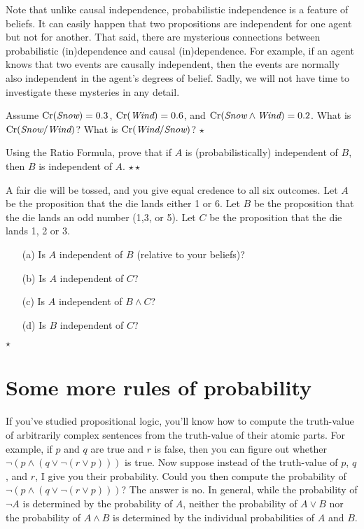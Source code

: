Note that unlike causal independence, probabilistic independence is a
feature of beliefs. It can easily happen that two propositions are
independent for one agent but not for another. That said, there are
mysterious connections between probabilistic (in)dependence and causal
(in)dependence. For example, if an agent knows that two events are
causally independent, then the events are normally also independent in
the agent's degrees of belief. Sadly, we will not have time to
investigate these mysteries in any detail.

\begin{exercise}
  Assume $\text{Cr}(\emph{Snow}) = 0.3$, $\text{Cr}(\emph{Wind}) = 0.6$, and $\text{Cr}(\emph{Snow} \land
  \emph{Wind}) = 0.2$. What is $\text{Cr}(\emph{Snow}/\emph{Wind})$? What is $\text{Cr}(\emph{Wind}/\emph{Snow})$? $\star$
\end{exercise}

\begin{exercise}
  Using the Ratio Formula, prove that if $A$ is (probabilistically)
  independent of $B$, then $B$ is independent of $A$. $\star\star$
\end{exercise}

\begin{exercise}
  A fair die will be tossed, and you give equal credence to all six
  outcomes. Let $A$ be the proposition that the die lands either 1 or
  6. Let $B$ be the proposition that the die lands an odd number (1,3,
  or 5). Let $C$ be the proposition that the die lands 1, 2 or 3.
  \begin{enumerate}
  \itemsep0em 
  \item[(a)] Is $A$ independent of $B$ (relative to your beliefs)?
  \item[(b)] Is $A$ independent of $C$?
  \item[(c)] Is $A$ independent of $B \land C$?
  \item[(d)] Is $B$ independent of $C$?
  \end{enumerate}
  $\star$
\end{exercise}

\section{Some more rules of probability}

If you've studied propositional logic, you'll know how to compute the
truth-value of arbitrarily complex sentences from the truth-value of
their atomic parts. For example, if $p$ and $q$ are true and $r$ is
false, then you can figure out whether $\neg(p \land (q \lor \neg(r
\lor p)))$ is true. Now suppose instead of the truth-value of $p$,
$q$, and $r$, I give you their probability. Could you then compute the
probability of $\neg (p \land (q \lor \neg(r \lor p)))$? The answer is
no. In general, while the probability of $\neg A$ is determined by the
probability of $A$, neither the probability of $A\lor B$ nor the
probability of $A \land B$ is determined by the individual
probabilities of $A$ and $B$.

